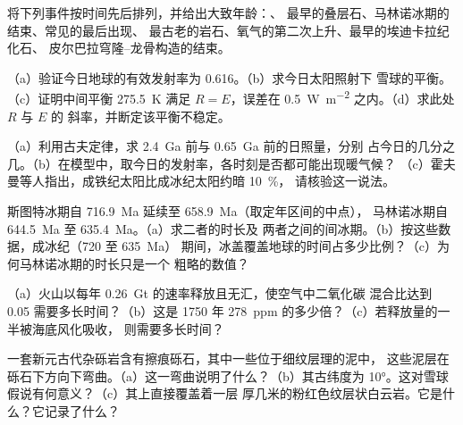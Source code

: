\begin{exercise}[$\star$]\label{exo:b2:precambrian-earth:4}
将下列事件按时间先后排列，并给出大致年龄：、
最早的叠层石、马林诺冰期的结束、常见的最后出现、
最古老的岩石、氧气的第二次上升、最早的埃迪卡拉纪化石、
皮尔巴拉穹隆–龙骨构造的结束。
\end{exercise}

\begin{exercise}[$\star\star$]\label{exo:b2:precambrian-earth:5}
（a）验证今日地球的有效发射率为 0.616。（b）求今日太阳照射下
雪球的平衡。（c）证明中间平衡 \qty{275.5}{K} 满足
$R = E$，误差在 \qty{0.5}{W.m^{-2}} 之内。（d）求此处 $R$ 与 $E$ 的
斜率，并断定该平衡不稳定。
\end{exercise}

\begin{exercise}[$\star\star$]\label{exo:b2:precambrian-earth:6}
（a）利用古夫定律，求 \qty{2.4}{Ga} 前与 \qty{0.65}{Ga} 前的日照量，分别
占今日的几分之几。（b）在模型中，取今日的发射率，各时刻是否都可能出现暖气候？
（c）霍夫曼等人指出，成铁纪太阳比成冰纪太阳约暗 \qty{10}{\percent}，
请核验这一说法。
\end{exercise}

\begin{exercise}[$\star\star$]\label{exo:b2:precambrian-earth:7}
斯图特冰期自 \qty{716.9}{Ma} 延续至 \qty{658.9}{Ma}（取定年区间的中点），
马林诺冰期自 \qty{644.5}{Ma} 至 \qty{635.4}{Ma}。（a）求二者的时长及
两者之间的间冰期。（b）按这些数据，成冰纪（720 至 \qty{635}{Ma}）
期间，冰盖覆盖地球的时间占多少比例？（c）为何马林诺冰期的时长只是一个
粗略的数值？
\end{exercise}

\begin{exercise}[$\star\star$]\label{exo:b2:precambrian-earth:8}
（a）火山以每年 \qty{0.26}{Gt} 的速率释放且无汇，使空气中二氧化碳
混合比达到 0.05 需要多长时间？（b）这是 1750 年 \qty{278}{ppm} 的多少倍？（c）若释放量的一半被海底风化吸收，
则需要多长时间？
\end{exercise}

\begin{exercise}[$\star\star$]\label{exo:b2:precambrian-earth:9}
一套新元古代杂砾岩含有擦痕砾石，其中一些位于细纹层理的泥中，
这些泥层在砾石下方向下弯曲。（a）这一弯曲说明了什么？（b）其古纬度为
\ang{10}。这对雪球假说有何意义？（c）其上直接覆盖着一层
厚几米的粉红色纹层状白云岩。它是什么？它记录了什么？
\end{exercise}

